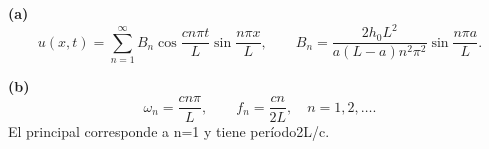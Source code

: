 \noindent\textbf{(a)} \[u(x,t)=\sum_{n=1}^{\infty}B_n\cos\frac{cn\pi t}{L}\sin\frac{n\pi x}{L},\qquad
B_n=\frac{2h_0L^2}{a(L-a)n^2\pi^2}\sin\frac{n\pi a}{L}.\]

\noindent\textbf{(b)} \[\omega_n=\frac{cn\pi}{L},\qquad f_n=\frac{cn}{2L},\quad n=1,2,\ldots.\]
El principal corresponde a n=1 y tiene período2L/c.
